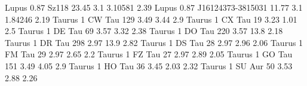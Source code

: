 Lupus             0.87  Sz118               23.45          3.1    3.10581       2.39
Lupus             0.87  J16124373-3815031   11.77          3.1    1.84246       2.19
Taurus            1     CW Tau             129             3.49   3.44          2.9
Taurus            1     CX Tau              19             3.23   1.01          2.5
Taurus            1     DE Tau              69             3.57   3.32          2.38
Taurus            1     DO Tau             220             3.57  13.8           2.18
Taurus            1     DR Tau             298             2.97  13.9           2.82
Taurus            1     DS Tau              28             2.97   2.96          2.06
Taurus            1     FM Tau              29             2.97   2.65          2.2
Taurus            1     FZ Tau              27             2.97   2.89          2.05
Taurus            1     GO Tau             151             3.49   4.05          2.9
Taurus            1     HO Tau              36             3.45   2.03          2.32
Taurus            1     SU Aur              50             3.53   2.88          2.26